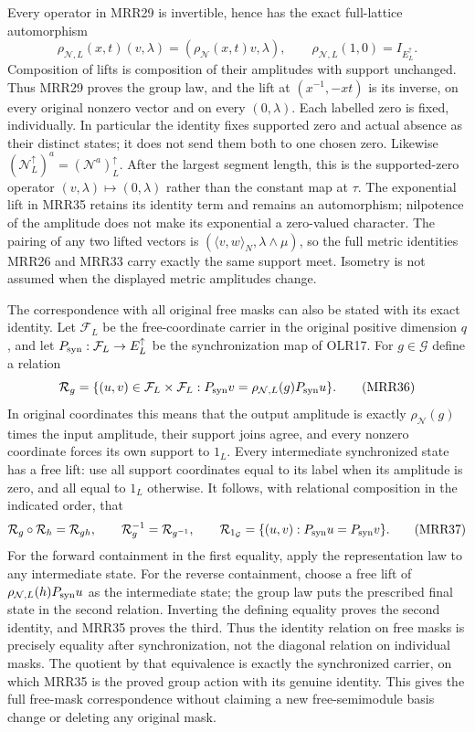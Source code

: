 Every operator in MRR29 is invertible, hence has the
exact full-lattice automorphism
\[
\rho_{\mathcal N,L}(x,t)(v,\lambda)
=(\rho_{\mathcal N}(x,t)v,\lambda),\qquad
\rho_{\mathcal N,L}(1,0)=I_{E_L^\uparrow}.
\tag{MRR35}
\]
Composition of lifts is composition of their amplitudes
with support unchanged. Thus MRR29 proves the group law,
and the lift at $(x^{-1},-xt)$ is its inverse, on every
original nonzero vector and on every $(0,\lambda)$.
Each labelled zero is fixed, individually. In particular
the identity fixes supported zero and actual absence as
their distinct states; it does not send them both to one
chosen zero.
Likewise $(\mathcal N_L^\uparrow)^a=(\mathcal N^a)_L^\uparrow$.
After the largest segment length, this is the supported-zero
operator $(v,\lambda)\mapsto(0,\lambda)$ rather than the
constant map at $\tau$. The exponential lift in MRR35
retains its identity term and remains an automorphism;
nilpotence of the amplitude does not make its exponential
a zero-valued character.
The pairing of any two lifted vectors is
$(\langle v,w\rangle_N,\lambda\wedge\mu)$, so the full
metric identities MRR26 and MRR33 carry exactly the same
support meet. Isometry is not assumed when the displayed
metric amplitudes change.

The correspondence with all original free masks can also
be stated with its exact identity. Let $\mathcal F_L$ be
the free-coordinate carrier in the original positive
dimension $q$, and let $P_{\rm syn}:\mathcal F_L\to E_L^\uparrow$
be the synchronization map of OLR17.
For $g\in\mathcal G$ define a relation
\[
\mathcal R_g=
\{(u,v)\in\mathcal F_L\times\mathcal F_L:
             P_{\rm syn}v=\rho_{\mathcal N,L}(g)P_{\rm syn}u\}.
\tag{MRR36}
\]
In original coordinates this means that the output
amplitude is exactly $\rho_{\mathcal N}(g)$ times the
input amplitude, their support joins agree, and every
nonzero coordinate forces its own support to $1_L$.
Every intermediate synchronized state has a free lift:
use all support coordinates equal to its label when its
amplitude is zero, and all equal to $1_L$ otherwise.
It follows, with relational composition in the indicated
order, that
\[
\mathcal R_g\circ\mathcal R_h=\mathcal R_{gh},\qquad
\mathcal R_g^{-1}=\mathcal R_{g^{-1}},\qquad
\mathcal R_{1_{\mathcal G}}
=\{(u,v):P_{\rm syn}u=P_{\rm syn}v\}.
\tag{MRR37}
\]
For the forward containment in the first equality,
apply the representation law to any intermediate state.
For the reverse containment, choose a free lift of
$\rho_{\mathcal N,L}(h)P_{\rm syn}u$ as the intermediate
state; the group law puts the prescribed final state
in the second relation. Inverting the defining equality
proves the second identity, and MRR35 proves the third.
Thus the identity relation on free masks is precisely
equality after synchronization, not the diagonal relation
on individual masks. The quotient by that equivalence
is exactly the synchronized carrier, on which MRR35 is
the proved group action with its genuine identity.
This gives the full free-mask correspondence without
claiming a new free-semimodule basis change or deleting
any original mask.

